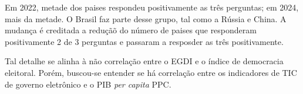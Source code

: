 Em 2022, metade dos paises respondeu positivamente as três perguntas; em 2024, mais da metade. O Brasil faz parte desse grupo, tal como a Rússia e China. A mudança é creditada a reduçãõ do número de paises que responderam positivamente 2 de 3 perguntas e passaram a resposder as três positivamente.

Tal detalhe se alinha à não correlação entre o EGDI e o índice de democracia eleitoral. Porém, buscou-se entender se há correlação entre os indicadores de TIC de governo eletrônico e o PIB \textit{per capita} PPC.